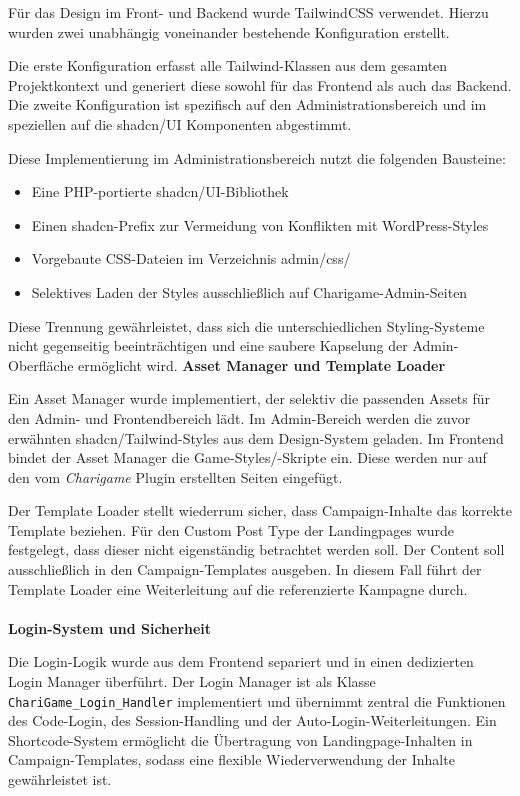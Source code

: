 Für das Design im Front- und Backend wurde TailwindCSS verwendet.
Hierzu wurden zwei unabhängig voneinander bestehende Konfiguration erstellt.

Die erste Konfiguration erfasst alle Tailwind-Klassen aus dem gesamten Projektkontext und generiert diese sowohl für das Frontend als auch das Backend.
Die zweite Konfiguration ist spezifisch auf den Administrationsbereich und im speziellen auf die shadcn/UI Komponenten abgestimmt.

Diese Implementierung im Administrationsbereich nutzt die folgenden Bausteine:
\begin{itemize}
\item Eine PHP-portierte shadcn/UI-Bibliothek
\item Einen shadcn-Prefix zur Vermeidung von Konflikten mit WordPress-Styles
\item Vorgebaute CSS-Dateien im Verzeichnis admin/css/
\item Selektives Laden der Styles ausschließlich auf Charigame-Admin-Seiten
\end{itemize}
Diese Trennung gewährleistet, dass sich die unterschiedlichen Styling-Systeme nicht gegenseitig beeinträchtigen und eine saubere Kapselung der Admin-Oberfläche ermöglicht wird.
\newpage
\textbf{Asset Manager und Template Loader}

Ein Asset Manager wurde implementiert, der selektiv die passenden Assets für den Admin- und Frontendbereich lädt.
Im Admin-Bereich werden die zuvor erwähnten shadcn/Tailwind-Styles aus dem Design-System geladen.
Im Frontend bindet der Asset Manager die Game-Styles/-Skripte ein.
Diese werden nur auf den vom \textit{Charigame} Plugin erstellten Seiten eingefügt.

Der Template Loader stellt wiederrum sicher, dass Campaign-Inhalte das korrekte Template beziehen.
Für den Custom Post Type der Landingpages wurde festgelegt, dass dieser nicht eigenständig betrachtet werden soll.
Der Content soll ausschließlich in den Campaign-Templates ausgeben.
In diesem Fall führt der Template Loader eine Weiterleitung auf die referenzierte Kampagne durch.
\\\\
\textbf{Login-System und Sicherheit}

Die Login-Logik wurde aus dem Frontend separiert und in einen dedizierten Login Manager überführt.
Der Login Manager ist als Klasse \texttt{ChariGame\_Login\_Handler} implementiert und übernimmt zentral die Funktionen des Code-Login, des Session-Handling und der Auto-Login-Weiterleitungen.
Ein Shortcode-System ermöglicht die Übertragung von Landingpage-Inhalten in Campaign-Templates, sodass eine flexible Wiederverwendung der Inhalte gewährleistet ist.

